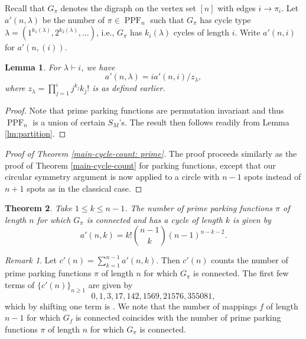 \documentclass[letterpaper]{amsart}
\theoremstyle{plain}
\newtheorem{theorem}{Theorem}
\newtheorem{lemma}[theorem]{Lemma}
\theoremstyle{definition}
\theoremstyle{remark}
\newtheorem*{remark}{Remark}
\DeclareMathOperator{\PPF}{PPF}
\begin{document}
Recall that $G_\pi$ denotes the digraph on the vertex set $[n]$ with edges $i \rightarrow \pi_i$. Let $a'(n,\lambda)$ be the number of $\pi\in \PPF_n$ such that $G_\pi$ has cycle type 
$\lambda=(1^{k_1(\lambda)}, 2^{k_2(\lambda)}, \dots)$, i.e., $G_\pi$ has $k_i(\lambda)$ cycles of length $i$. Write $a'(n,i)$ for $a'(n,(i))$. 

\begin{lemma}\label{lem:a'(n,lambda)-and-a'(n,i)}
For $\lambda\vdash i$, we have
\begin{equation*}\label{eq:identity'}
a'(n,\lambda) = i a'(n,i)/z_\lambda,
\end{equation*}
where $z_\lambda=\prod_{j=1}^i j^{k_j} k_j!$ is as defined earlier.
\end{lemma}

\begin{proof}
Note that prime parking functions are permutation invariant and thus $\PPF_n$ is a union of certain $S_M$'s. The result then follows readily from Lemma \ref{lm:partition}.
\end{proof}

\begin{proof}[Proof of Theorem \ref{main-cycle-count: prime}]
The proof proceeds similarly as the proof of Theorem \ref{main-cycle-count} for parking functions, except that our circular symmetry argument is now applied to a circle with $n-1$ spots instead of $n+1$ spots as in the classical case.
\end{proof}

\begin{theorem}\label{main-cycle-count-special: prime}
Take $1\leq k \leq n-1$. The number of prime parking functions $\pi$ of length $n$ for which $G_\pi$ is connected and has a cycle of length $k$ is given by
\begin{equation*}
a'(n, k)=k! \binom{n-1}{k} (n-1)^{n-k-2}.
\end{equation*}
\end{theorem}

\begin{remark}\label{rk:prime_parking}
Let $c'(n)=\sum_{k=1}^{n-1} a'(n, k)$. Then $c'(n)$ counts the number of prime parking functions $\pi$ of length $n$ for which $G_\pi$ is connected. The first few terms of $\{c'(n)\}_{n \geq 1}$ are given by
\[0, 1, 3, 17, 142, 1569, 21576, 355081,\]
which by shifting one term is \cite[OEIS A001865]{OEIS}. We note that the number of mappings $f$ of length $n-1$ for which $G_f$ is connected coincides with the number of prime parking functions $\pi$ of length $n$ for which $G_\pi$ is connected.
\end{remark}
\end{document}
